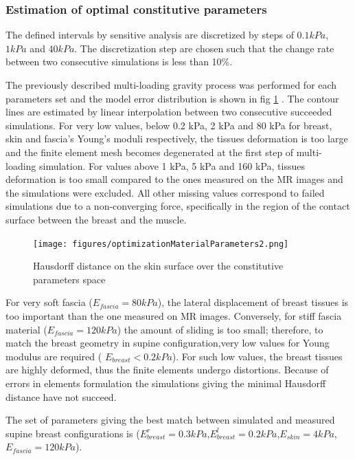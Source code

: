 \subsubsection*{Estimation of optimal constitutive parameters}
The defined intervals by sensitive analysis are discretized by steps of $0.1 kPa$, $1kPa$ and $40 kPa$. The discretization step are chosen such that the change rate between two consecutive simulations is less than 10\%.

The previously described multi-loading gravity process was performed for each parameters set and the model error distribution is shown in fig \ref{fig:optimizationresults} . The contour lines are estimated by linear interpolation between two consecutive succeeded simulations. For very low values, below 0.2 kPa, 2 kPa and 80 kPa for breast, skin and fascia's Young's moduli respectively, the tissues deformation is too large and the finite element mesh becomes degenerated at the first step of multi-loading simulation. For values above 1 kPa, 5 kPa and 160 kPa, tissues deformation is too small compared to the ones measured on the MR images and the simulations were excluded. All other missing values correspond to failed simulations due to a non-converging force, specifically in the region of the contact surface between the breast and the muscle.

\begin{figure}[!h]
\centering
\texttt{[image: figures/optimizationMaterialParameters2.png]} 
\caption{Hausdorff distance on the skin surface over the constitutive parameters space}\label{fig:optimizationresults}
\end{figure}

 

For very soft fascia ($E_{fascia} = 80kPa$), the lateral displacement of breast tissues is too important than the one measured on  MR images. Conversely, for stiff fascia material ($E_{fascia}=120 kPa$) the amount of sliding is too small; therefore, to match the breast geometry in supine configuration,very low values for Young modulus are required ( $E_{breast}< 0.2kPa$). For such low values, the breast tissues are highly deformed, thus the finite elements undergo distortions. Because of  errors in elements formulation the simulations giving the minimal Hausdorff distance have not succeed.   

The set of parameters giving the best match between simulated and measured supine breast configurations is ($E_{breast}^r=0.3 kPa$,$E_{breast}^l=0.2 kPa$,$E_{skin}=4 kPa$,$E_{fascia}=120 kPa$).  





   



